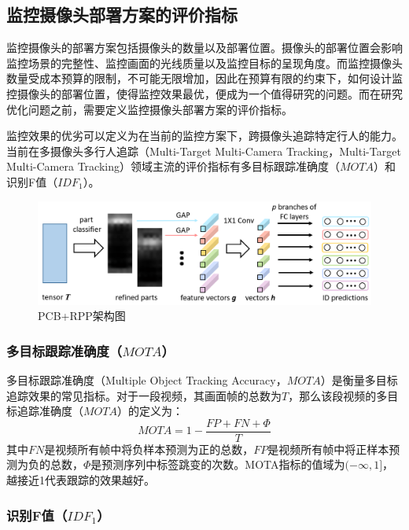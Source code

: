 \subsection{监控摄像头部署方案的评价指标}

监控摄像头的部署方案包括摄像头的数量以及部署位置。摄像头的部署位置会影响监控场景的完整性、监控画面的光线质量以及监控目标的呈现角度。而监控摄像头数量受成本预算的限制，不可能无限增加，因此在预算有限的约束下，如何设计监控摄像头的部署位置，使得监控效果最优，便成为一个值得研究的问题。而在研究优化问题之前，需要定义监控摄像头部署方案的评价指标。

监控效果的优劣可以定义为在当前的监控方案下，跨摄像头追踪特定行人的能力。当前在多摄像头多行人追踪（Multi-Target Multi-Camera Tracking，Multi-Target Multi-Camera Tracking）领域主流的评价指标有多目标跟踪准确度（$\mathit{MOTA}$）和识别F值（$\mathit{IDF_1}$）。

\begin{figure}
\centering
\includegraphics[width=1\textwidth]{figure/structure2}
\caption{PCB+RPP架构图}
\label{fig:structure2}
\end{figure}

\subsubsection{多目标跟踪准确度（$\mathit{MOTA}$）}

多目标跟踪准确度（Multiple Object Tracking Accuracy，$\mathit{MOTA}$）是衡量多目标追踪效果的常见指标。对于一段视频，其画面帧的总数为$T$，那么该段视频的多目标追踪准确度（$\mathit{MOTA}$）的定义为：
\begin{equation}
\mathit{MOTA}=1-\frac{\mathit{FP}+\mathit{FN}+\Phi}{T}
\end{equation}
其中$\mathit{FN}$是视频所有帧中将负样本预测为正的总数，$\mathit{FP}$是视频所有帧中将正样本预测为负的总数，$\Phi$是预测序列中标签跳变的次数。MOTA指标的值域为$(-\infty,1]$，越接近1代表跟踪的效果越好。

\subsubsection{识别F值（$\mathit{IDF_1}$）}

